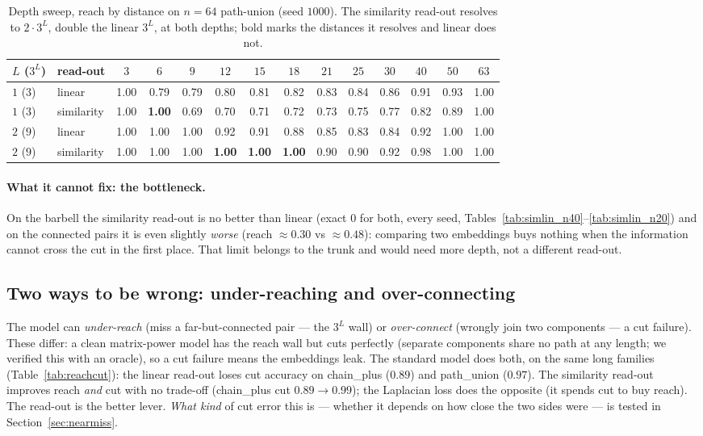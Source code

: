 \documentclass[11pt,a4paper]{article}
\begin{document}
\begin{table}[H]
\centering
\small
\begin{tabular}{llcccccccccccc}
\toprule
$L$ ($3^L$) & read-out & $3$ & $6$ & $9$ & $12$ & $15$ & $18$ & $21$ & $25$ & $30$ & $40$ & $50$ & $63$ \\
\midrule
$1$ ($3$) & linear     & 1.00 & 0.79 & 0.79 & 0.80 & 0.81 & 0.82 & 0.83 & 0.84 & 0.86 & 0.91 & 0.93 & 1.00 \\
$1$ ($3$) & similarity & 1.00 & \textbf{1.00} & 0.69 & 0.70 & 0.71 & 0.72 & 0.73 & 0.75 & 0.77 & 0.82 & 0.89 & 1.00 \\
$2$ ($9$) & linear     & 1.00 & 1.00 & 1.00 & 0.92 & 0.91 & 0.88 & 0.85 & 0.83 & 0.84 & 0.92 & 1.00 & 1.00 \\
$2$ ($9$) & similarity & 1.00 & 1.00 & 1.00 & \textbf{1.00} & \textbf{1.00} & \textbf{1.00} & 0.90 & 0.90 & 0.92 & 0.98 & 1.00 & 1.00 \\
\bottomrule
\end{tabular}
\caption{Depth sweep, reach by distance on $n=64$ path-union (seed $1000$). The similarity
read-out resolves to $2\cdot 3^L$, double the linear $3^L$, at both depths; bold marks the
distances it resolves and linear does not.}
\label{tab:depthsim}
\end{table}

\paragraph{What it cannot fix: the bottleneck.} On the barbell the similarity read-out is no
better than linear (exact $0$ for both, every seed, Tables~\ref{tab:simlin_n40}--\ref{tab:simlin_n20})
and on the connected pairs it is even slightly \emph{worse} (reach $\approx0.30$ vs $\approx0.48$):
comparing two embeddings buys nothing when the information cannot cross the cut in the first
place. That limit belongs to the trunk and would need more depth, not a different read-out.

\subsection{Two ways to be wrong: under-reaching and over-connecting}
\label{sec:reachcut}

The model can \emph{under-reach} (miss a far-but-connected pair --- the $3^L$ wall) or
\emph{over-connect} (wrongly join two components --- a cut failure). These differ: a clean
matrix-power model has the reach wall but cuts perfectly (separate components share no path
at any length; we verified this with an oracle), so a cut failure means the embeddings leak.
The standard model does both, on the same long families (Table~\ref{tab:reachcut}): the
linear read-out loses cut accuracy on chain\_plus ($0.89$) and path\_union ($0.97$). The
similarity read-out improves reach \emph{and} cut with no trade-off (chain\_plus cut
$0.89\to0.99$); the Laplacian loss does the opposite (it spends cut to buy reach). The
read-out is the better lever. \emph{What kind} of cut error this is --- whether it depends
on how close the two sides were --- is tested in Section~\ref{sec:nearmiss}.
\end{document}
